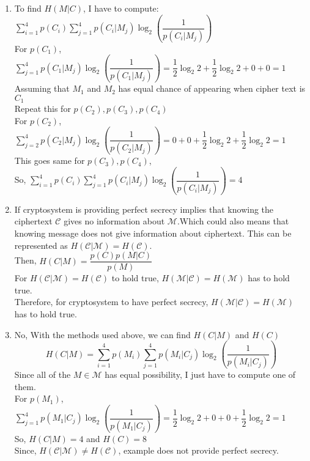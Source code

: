 \documentclass[11pt]{article}
\theoremstyle{definition}
\begin{document}
\begin{enumerate}
		\begin{enumerate}
			\item To find $H(M|C)$, I have to compute:\\
			$\sum_{i=1}^{4}p(C_{i}) \sum_{j=1}^{4} p(C_{i}|M_{j})\log_{2}(\dfrac{1}{p(C_{i}|M_{j})})$\\
			For $p(C_{1})$, $\sum_{j=1}^{4} p(C_{1}|M_{j})\log_{2}(\dfrac{1}{p(C_{1}|M_{j})}) = \dfrac{1}{2} \log_{2} 2 + \dfrac{1}{2} \log_{2} 2 + 0 + 0 = 1$ Assuming that $M_{1}$ and $M_{2}$ has equal chance of appearing when cipher text is $C_{1}$\\
			Repeat this for $p(C_{2}),p(C_{3}),p(C_{4})$\\
			For $p(C_{2})$, $\sum_{j=2}^{4} p(C_{2}|M_{j})\log_{2}(\dfrac{1}{p(C_{2}|M_{j})}) = 0 + 0  + \dfrac{1}{2} \log_{2} 2 + \dfrac{1}{2} \log_{2} 2 = 1$\\
			This goes same for  $p(C_{3}),p(C_{4})$,\\
			So, $\sum_{i=1}^{4}p(C_{i}) \sum_{j=1}^{4} p(C_{i}|M_{j})\log_{2}(\dfrac{1}{p(C_{i}|M_{j})}) = 4$
			\item If cryptosystem is providing perfect secrecy implies that knowing the ciphertext $\mathcal{C}$ gives no information about $\mathcal{M}$.Which could also means that knowing message does not give information about ciphertext. This can be represented as
			$H(\mathcal{C}|\mathcal{M}) = H(\mathcal{C})$.\\
			Then, $H(C|M) = \dfrac{p(C)p(M|C)}{p(M)}$\\
			For $H(\mathcal{C}|\mathcal{M}) = H(\mathcal{C})$ to hold true,  $H(\mathcal{M}|\mathcal{C}) = H(\mathcal{M})$ has to hold true.\\
			Therefore, for cryptosystem to have perfect secrecy, $H(\mathcal{M}|\mathcal{C}) = H(\mathcal{M})$ has to hold true.
			
			
			\item No, 
			With the methods used above, we can find $H(C|M)$ and $H(C)$\\
			\[H(C|M) = \sum_{i=1}^{4}p(M_{i}) \sum_{j=1}^{4} p(M_{i}|C_{j})\log_{2}(\dfrac{1}{p(M_{i}|C_{j})})\]
			Since all of the $M \in \mathcal{M}$ has equal possibility, I just have to compute one of them.\\
			For $p(M_{1})$, $\sum_{j=1}^{4} p(M_{1}|C_{j})\log_{2}(\dfrac{1}{p(M_{1}|C_{j})}) = \dfrac{1}{2} \log_{2} 2 + 0 + 0 + \dfrac{1}{2} \log_{2} 2 = 1$\\
			So, $H(C|M) = 4 $ and $H(C) = 8$\\
			Since, $H(\mathcal{C}|\mathcal{M}) \ne H(\mathcal{C})$, example does not provide perfect secrecy.
			

\end{enumerate}
\end{enumerate}
\end{document}
